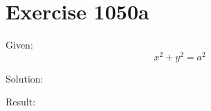 \documentclass[a4paper, 10pt]{scrartcl}
\begin{document}
\section{Exercise 1050a}

Given:
\[
x^{2} + y^{2} = a^{2}
\]

Solution:

Result:
\end{document}
